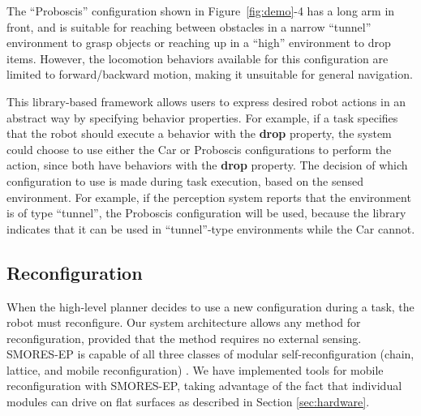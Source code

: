 \documentclass[12pt]{article}
\begin{document}
The ``Proboscis'' configuration shown in Figure~\ref{fig:demo}-4 has
a long arm in front, and is suitable for reaching between obstacles in a narrow ``tunnel'' environment to grasp objects or reaching up in a ``high'' environment to drop items.
However, the locomotion behaviors available for this configuration are limited to forward/backward
motion, making it unsuitable for general navigation.

This library-based framework allows users to express desired robot actions in an abstract way by specifying behavior properties. For example, if a task specifies that the robot should execute a behavior with the \textbf{drop} property, the system could choose to use either the Car or Proboscis configurations to perform the action, since both have behaviors with the \textbf{drop} property.
The decision of which configuration to use is made during task execution, based on the sensed environment.
For example, if the perception system reports that the environment is of type ``tunnel'', the Proboscis configuration will be used, because the library indicates that it can be used in ``tunnel''-type environments while the Car cannot.

%


\subsection{Reconfiguration}
\label{sec:reconfiguration-supplement}
%
When the high-level planner decides to use a new configuration during a task, the robot must reconfigure. Our system architecture allows any method for reconfiguration, provided that the method requires no external sensing. SMORES-EP is capable of all three classes of modular self-reconfiguration (chain, lattice, and mobile reconfiguration) \cite{Davey2012,yim2003modular}.  We have implemented tools for mobile reconfiguration with SMORES-EP, taking advantage of the fact that individual modules can drive on flat surfaces as described in Section \ref{sec:hardware}.
\end{document}
